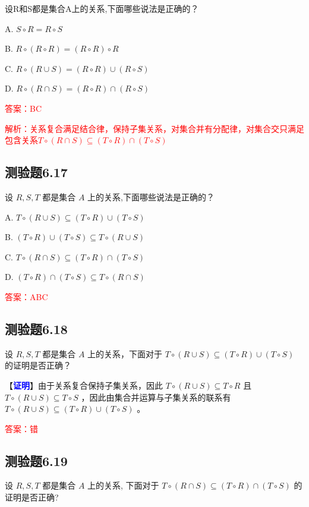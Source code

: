 \documentclass[UTF8, heading=true]{ctexart}
\begin{document}
设R和S都是集合A上的关系,下面哪些说法是正确的？

A. $S \circ R=R \circ S$

B. $R \circ(R \circ R)=(R \circ R) \circ R$

C. $R \circ(R \cup S)=(R \circ R) \cup(R \circ S)$

D. $R \circ(R \cap S)=(R \circ R) \cap(R \circ S)$

\textcolor{red}{答案：BC}

\textcolor{red}{解析：关系复合满足结合律，保持子集关系，对集合并有分配律，对集合交只满足包含关系$T \circ (R \cap S) \subseteq (T \circ R) \cap (T \circ S)$}



\subsection{测验题6.17}

设 $R, S, T$ 都是集合 $A$ 上的关系,下面哪些说法是正确的？

A. $T \circ (R \cup S) \subseteq (T \circ R) \cup (T \circ S)$

B. $ (T \circ R) \cup (T \circ S) \subseteq T \circ (R \cup S)$

C. $T \circ (R \cap S) \subseteq (T \circ R) \cap (T \circ S)$

D. $(T \circ R) \cap (T \circ S) \subseteq T \circ (R \cap S)$


\textcolor{red}{答案：ABC}

\subsection{测验题6.18}

设 $R, S, T$ 都是集合 $A$ 上的关系，下面对于 $T \circ(R \cup S) \subseteq(T \circ R) \cup(T \circ S)$ 的证明是否正确？

【\textbf{\textcolor{blue}{证明}}】由于关系复合保持子集关系，因此 $T \circ(R \cup S) \subseteq T \circ R$ 且 $T \circ(R \cup S) \subseteq T \circ S$ ，因此由集合并运算与子集关系的联系有 $T \circ(R \cup S) \subseteq(T \circ R) \cup(T \circ S)$ 。

\textcolor{red}{答案：错}

\subsection{测验题6.19}

设 $R, S, T$ 都是集合 $A$ 上的关系, 下面对于 $T \circ(R \cap S) \subseteq(T \circ R) \cap(T \circ S)$ 的证明是否正确?
\end{document}
